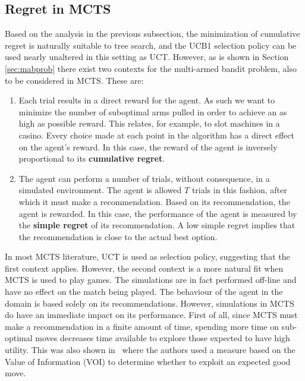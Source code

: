 \documentclass{kecsmstr}
\begin{document}
\subsection{Regret in MCTS}

Based on the analysis in the previous subsection, the minimization of cumulative regret is naturally suitable to tree search, and the UCB1 selection policy can be used nearly unaltered in this setting as UCT. However, as is shown in Section \ref{sec:mabprob} there exist two contexts for the multi-armed bandit problem, also to be considered in MCTS. These are:

\begin{enumerate}

\item Each trial results in a direct reward for the agent. As such we want to minimize the number of suboptimal arms pulled in order to achieve an as high as possible reward. This relates, for example, to slot machines in a casino. Every choice made at each point in the algorithm has a direct effect on the agent's reward. In this case, the reward of the agent is inversely proportional to its \textbf{cumulative regret}.

\item The agent can perform a number of trials, without consequence, in a simulated environment. The agent is allowed $T$ trials in this fashion, after which it must make a recommendation. Based on its recommendation, the agent is rewarded. In this case, the performance of the agent is measured by the \textbf{simple regret} of its recommendation. A low simple regret implies that the recommendation is close to the actual best option.

\end{enumerate}

In most MCTS literature, UCT is used as selection policy, suggesting that the first context applies. However, the second context is a more natural fit when MCTS is used to play games. The simulations are in fact performed off-line and have no effect on the match being played. The behaviour of the agent in the domain is based solely on its recommendations. 
However, simulations in MCTS do have an immediate impact on its performance. First of all, since MCTS must make a recommendation in a finite amount of time, spending more time on sub-optimal moves decreases time available to explore those expected to have high utility. This was also shown in~ where the authors used a measure based on the Value of Information (VOI) to determine whether to exploit an expected good move.
\end{document}
